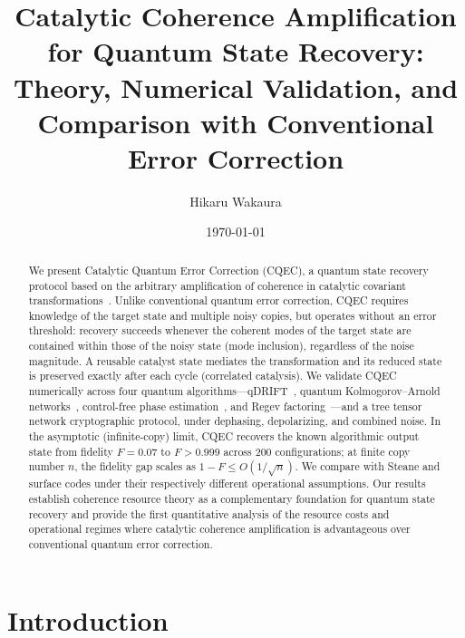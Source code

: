 \documentclass[prx,twocolumn,superscriptaddress,longbibliography,floatfix]{revtex4-2}
\begin{document}
\title{Catalytic Coherence Amplification for Quantum State Recovery:\\
Theory, Numerical Validation, and Comparison with Conventional Error Correction}

\author{Hikaru Wakaura}

\date{\today}

\begin{abstract}
We present Catalytic Quantum Error Correction (CQEC), a quantum state recovery protocol based on the arbitrary amplification of coherence in catalytic covariant transformations~\cite{Shiraishi2024}.
Unlike conventional quantum error correction, CQEC requires knowledge of the target state and multiple noisy copies, but operates without an error threshold: recovery succeeds whenever the coherent modes of the target state are contained within those of the noisy state (mode inclusion), regardless of the noise magnitude.
A reusable catalyst state mediates the transformation and its reduced state is preserved exactly after each cycle (correlated catalysis).
We validate CQEC numerically across four quantum algorithms---qDRIFT~\cite{Campbell2019}, quantum Kolmogorov--Arnold networks~\cite{Ivashkov2024}, control-free phase estimation~\cite{Clinton2026}, and Regev factoring~\cite{Regev2024}---and a tree tensor network cryptographic protocol, under dephasing, depolarizing, and combined noise.
In the asymptotic (infinite-copy) limit, CQEC recovers the known algorithmic output state from fidelity $F = 0.07$ to $F > 0.999$ across 200 configurations; at finite copy number $n$, the fidelity gap scales as $1 - F \leq O(1/\sqrt{n})$.
We compare with Steane and surface codes under their respectively different operational assumptions.
Our results establish coherence resource theory as a complementary foundation for quantum state recovery and provide the first quantitative analysis of the resource costs and operational regimes where catalytic coherence amplification is advantageous over conventional quantum error correction.
\end{abstract}

\maketitle

\section{Introduction}
\label{sec:introduction}
\end{document}
